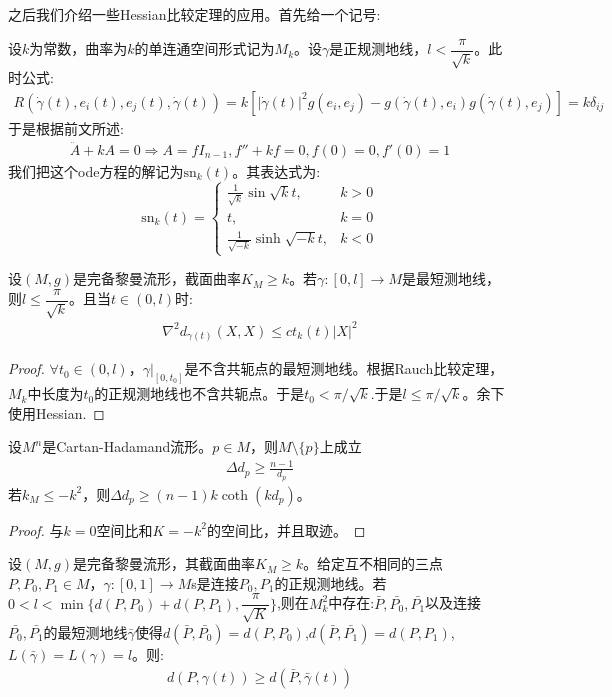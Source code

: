 之后我们介绍一些Hessian比较定理的应用。首先给一个记号:
\begin{definition}
    设$k$为常数，曲率为$k$的单连通空间形式记为$M_k$。设$\gamma$是正规测地线，$l<\dfrac{\pi}{\sqrt{k}}$。此时公式:
    \begin{align*}
        R(\dot{\gamma}(t),e_i(t),e_j(t),\dot{\gamma}(t))=k[|\dot{\gamma}(t)|^2g(e_i,e_j)-g(\dot{\gamma}(t),e_i)g(\dot{\gamma}(t),e_j)]=k\delta_{ij}
    \end{align*}
    于是根据前文所述:
    \begin{align*}
\ddot{A}+kA=0 \Rightarrow A=fI_{n-1},f''+kf=0,f(0)=0,f'(0)=1
    \end{align*}
    我们把这个ode方程的解记为$\mathrm{sn}_k(t)$。其表达式为:
    \begin{equation*}
        \mathrm{sn}_k(t)=\left \{
        \begin{aligned}
        \frac{1}{\sqrt{k}}\sin \sqrt{k}t,&k>0\\ 
        t,&k=0\\ 
        \frac{1}{\sqrt{-k}}\sinh\sqrt{-k}t ,&k<0
        \end{aligned} \right.
\end{equation*}
\end{definition}
\begin{corollary}
    设$(M,g)$是完备黎曼流形，截面曲率$K_M \geq k$。若$\gamma:[0,l] \to M$是最短测地线，则$l \leq \dfrac{\pi}{\sqrt{k}}$。且当$t \in (0,l)$时:
    \begin{align*}
        \nabla^2 d_{\gamma(t)}(X,X)\leq ct_k(t)|X|^2
    \end{align*}
\end{corollary}
\begin{proof}
    $\forall t_0 \in (0,l)$，$\gamma|_{[0,t_0]}$是不含共轭点的最短测地线。根据Rauch比较定理，$M_k$中长度为$t_0$的正规测地线也不含共轭点。于是$t_0<\pi/\sqrt{k}$.于是$l\leq \pi/\sqrt{k}$。余下使用Hessian.
\end{proof}
\begin{corollary}
    设$M^n$是Cartan-Hadamand流形。$p\in M$，则$M\setminus\{p\}$上成立
    \begin{align*}
        \Delta d_p \geq \frac{n-1}{d_p}
    \end{align*}
    若$k_M\leq -k^2$，则$\Delta d_p \geq (n-1)k \coth(kd_p)$。
\end{corollary}
\begin{proof}
    与$k=0$空间比和$K=-k^2$的空间比，并且取迹。
\end{proof}
\begin{theorem}[Toponogov三角形比较定理]
    设$(M,g)$是完备黎曼流形，其截面曲率$K_M \geq k$。给定互不相同的三点$P,P_0,P_1 \in M$，$\gamma:[0,1] \to M$s是连接$P_0,P_1$的正规测地线。若$0<l<\min\{d(P,P_0)+d(P,P_1),\dfrac{\pi}{\sqrt{K}}\}$,则在$M_k^2$中存在:$\bar{P},\bar{P_0},\bar{P_1}$以及连接$\bar{P_0},\bar{P_1}$的最短测地线$\bar{\gamma}$使得$d(\bar{P},\bar{P_0})=d(P,P_0)$,$d(\bar{P},\bar{P_1})=d(P,P_1)$,$L(\bar{\gamma})=L(\gamma)=l$。则:
    \begin{align*}
        d(P,\gamma(t))\geq d(\bar{P},\bar{\gamma}(t))
    \end{align*}
\end{theorem}
